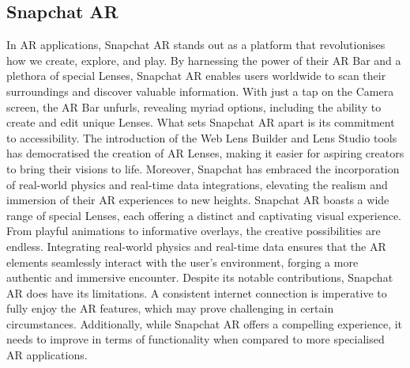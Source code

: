 \subsection*{Snapchat AR}
In \ac{AR} applications, Snapchat \ac{AR} stands out as a platform that revolutionises how we create, explore, and play. By harnessing the power of their \ac{AR} Bar and a plethora of special Lenses, Snapchat \ac{AR} enables users worldwide to scan their surroundings and discover valuable information. With just a tap on the Camera screen, the \ac{AR} Bar unfurls, revealing myriad options, including the ability to create and edit unique Lenses.
What sets Snapchat \ac{AR} apart is its commitment to accessibility. The introduction of the Web Lens Builder and Lens Studio tools has democratised the creation of \ac{AR} Lenses, making it easier for aspiring creators to bring their visions to life. Moreover, Snapchat has embraced the incorporation of real-world physics and real-time data integrations, elevating the realism and immersion of their \ac{AR} experiences to new heights.
Snapchat \ac{AR} boasts a wide range of special Lenses, each offering a distinct and captivating visual experience. From playful animations to informative overlays, the creative possibilities are endless. Integrating real-world physics and real-time data ensures that the \ac{AR} elements seamlessly interact with the user's environment, forging a more authentic and immersive encounter.
Despite its notable contributions, Snapchat \ac{AR} does have its limitations. A consistent internet connection is imperative to fully enjoy the \ac{AR} features, which may prove challenging in certain circumstances. Additionally, while Snapchat \ac{AR} offers a compelling experience, it needs to improve in terms of functionality when compared to more specialised \ac{AR} applications.

